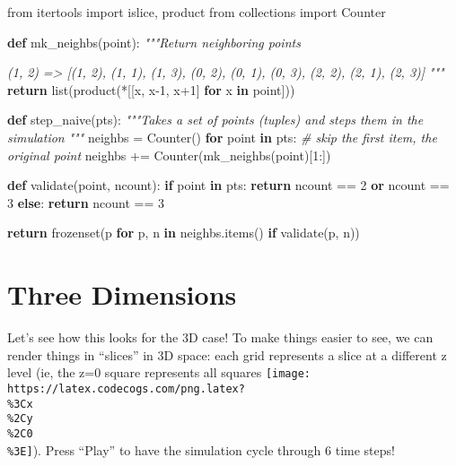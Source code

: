 \documentclass[]{article}
\newenvironment{Shaded}{}{}
\newcommand{\BuiltInTok}[1]{#1}
\newcommand{\CommentTok}[1]{\textcolor[rgb]{0.38,0.63,0.69}{\textit{#1}}}
\newcommand{\ControlFlowTok}[1]{\textcolor[rgb]{0.00,0.44,0.13}{\textbf{#1}}}
\newcommand{\DecValTok}[1]{\textcolor[rgb]{0.25,0.63,0.44}{#1}}
\newcommand{\ImportTok}[1]{#1}
\newcommand{\KeywordTok}[1]{\textcolor[rgb]{0.00,0.44,0.13}{\textbf{#1}}}
\newcommand{\NormalTok}[1]{#1}
\newcommand{\OperatorTok}[1]{\textcolor[rgb]{0.40,0.40,0.40}{#1}}
\begin{document}
\begin{Shaded}
\begin{Highlighting}[]
\ImportTok{from}\NormalTok{ itertools }\ImportTok{import}\NormalTok{ islice, product}
\ImportTok{from}\NormalTok{ collections }\ImportTok{import}\NormalTok{ Counter}

\KeywordTok{def}\NormalTok{ mk\_neighbs(point):}
    \CommentTok{"""Return neighboring points}

\CommentTok{    (1, 2)}
\CommentTok{    => [(1, 2), (1, 1), (1, 3), (0, 2), (0, 1), (0, 3), (2, 2), (2, 1), (2, 3)]}
\CommentTok{    """}
    \ControlFlowTok{return} \BuiltInTok{list}\NormalTok{(product(}\OperatorTok{*}\NormalTok{[[x, x}\DecValTok{{-}1}\NormalTok{, x}\OperatorTok{+}\DecValTok{1}\NormalTok{] }\ControlFlowTok{for}\NormalTok{ x }\KeywordTok{in}\NormalTok{ point]))}

\KeywordTok{def}\NormalTok{ step\_naive(pts):}
    \CommentTok{"""Takes a set of points (tuples) and steps them in the simulation}
\CommentTok{    """}
\NormalTok{    neighbs }\OperatorTok{=}\NormalTok{ Counter()}
    \ControlFlowTok{for}\NormalTok{ point }\KeywordTok{in}\NormalTok{ pts:}
        \CommentTok{\# skip the first item, the original point}
\NormalTok{        neighbs }\OperatorTok{+=}\NormalTok{ Counter(mk\_neighbs(point)[}\DecValTok{1}\NormalTok{:])}

    \KeywordTok{def}\NormalTok{ validate(point, ncount):}
        \ControlFlowTok{if}\NormalTok{ point }\KeywordTok{in}\NormalTok{ pts:}
            \ControlFlowTok{return}\NormalTok{ ncount }\OperatorTok{==} \DecValTok{2} \KeywordTok{or}\NormalTok{ ncount }\OperatorTok{==} \DecValTok{3}
        \ControlFlowTok{else}\NormalTok{:}
            \ControlFlowTok{return}\NormalTok{ ncount }\OperatorTok{==} \DecValTok{3}

    \ControlFlowTok{return} \BuiltInTok{frozenset}\NormalTok{(p }\ControlFlowTok{for}\NormalTok{ p, n }\KeywordTok{in}\NormalTok{ neighbs.items() }\ControlFlowTok{if}\NormalTok{ validate(p, n))}
\end{Highlighting}
\end{Shaded}

\hypertarget{three-dimensions}{%
\section{Three Dimensions}\label{three-dimensions}}

Let's see how this looks for the 3D case! To make things easier to see, we can
render things in ``slices'' in 3D space: each grid represents a slice at a
different z level (ie, the z=0 square represents all squares
\texttt{[image: https://latex.codecogs.com/png.latex?\\\%3Cx\\\%2Cy\\\%2C0\\\%3E]}).
Press ``Play'' to have the simulation cycle through 6 time steps!
\end{document}

